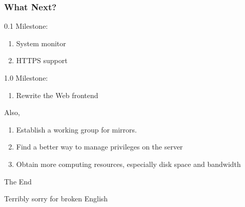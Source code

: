 \documentclass{beamer}
\begin{document}
\begin{frame}
\frametitle{What Next?}
0.1 Milestone:
\begin{enumerate}
\item System monitor
\item HTTPS support
\end{enumerate}
1.0 Milestone:
\begin{enumerate}
\item Rewrite the Web frontend
\end{enumerate}
Also,
\begin{enumerate}
\item Establish a working group for mirrors.
\item Find a better way to manage privileges on the server
\item Obtain more computing resources, especially disk space and bandwidth
\end{enumerate}

\end{frame}


\begin{frame}
\huge{\centerline{The End}}
\tiny{\centerline{Terribly sorry for broken English}}
\end{frame}

\end{document}
